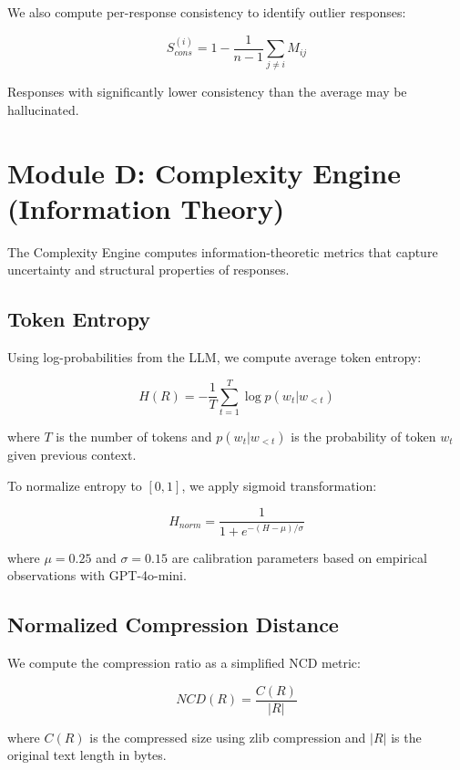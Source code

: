 We also compute per-response consistency to identify outlier responses:

\begin{equation}
    S_{cons}^{(i)} = 1 - \frac{1}{n-1} \sum_{j \neq i} M_{ij}
\end{equation}

Responses with significantly lower consistency than the average may be hallucinated.

\section{Module D: Complexity Engine (Information Theory)}

The Complexity Engine computes information-theoretic metrics that capture uncertainty and structural properties of responses.

\subsection{Token Entropy}

Using log-probabilities from the LLM, we compute average token entropy:

\begin{equation}
    H(R) = -\frac{1}{T} \sum_{t=1}^{T} \log p(w_t | w_{<t})
\end{equation}

where $T$ is the number of tokens and $p(w_t | w_{<t})$ is the probability of token $w_t$ given previous context.

To normalize entropy to $[0, 1]$, we apply sigmoid transformation:

\begin{equation}
    H_{norm} = \frac{1}{1 + e^{-(H - \mu)/\sigma}}
\end{equation}

where $\mu = 0.25$ and $\sigma = 0.15$ are calibration parameters based on empirical observations with GPT-4o-mini.

\subsection{Normalized Compression Distance}

We compute the compression ratio as a simplified NCD metric:

\begin{equation}
    NCD(R) = \frac{C(R)}{|R|}
\end{equation}

where $C(R)$ is the compressed size using zlib compression and $|R|$ is the original text length in bytes.

